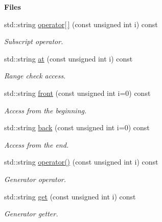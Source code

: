 \begin{Indent}{\bf Files}\par
\begin{DoxyCompactItemize}
\item 
std\-::string \hyperlink{exceptionmagrathea_1_1FileList_a565d85f1e3c563f876965ba4126d0625}{operator\mbox{[}$\,$\mbox{]}} (const unsigned int i) const 
\begin{DoxyCompactList}\small\item\em Subscript operator. \end{DoxyCompactList}\item 
std\-::string \hyperlink{exceptionmagrathea_1_1FileList_ac6b696190d9c53ea364245c3c7e18634}{at} (const unsigned int i) const 
\begin{DoxyCompactList}\small\item\em Range check access. \end{DoxyCompactList}\item 
std\-::string \hyperlink{exceptionmagrathea_1_1FileList_a089dc4227aaac25165c4d861c723a4e8}{front} (const unsigned int i=0) const 
\begin{DoxyCompactList}\small\item\em Access from the beginning. \end{DoxyCompactList}\item 
std\-::string \hyperlink{exceptionmagrathea_1_1FileList_a9c05777243b3664c7038c1f42b5daccc}{back} (const unsigned int i=0) const 
\begin{DoxyCompactList}\small\item\em Access from the end. \end{DoxyCompactList}\item 
std\-::string \hyperlink{exceptionmagrathea_1_1FileList_aa79f022c679f4761987915688e3b7f7f}{operator()} (const unsigned int i) const 
\begin{DoxyCompactList}\small\item\em Generator operator. \end{DoxyCompactList}\item 
std\-::string \hyperlink{exceptionmagrathea_1_1FileList_a867eab1ceefcc1b7e3190ce4af5fbb83}{get} (const unsigned int i) const 
\begin{DoxyCompactList}\small\item\em Generator getter. \end{DoxyCompactList}\end{DoxyCompactItemize}
\end{Indent}
